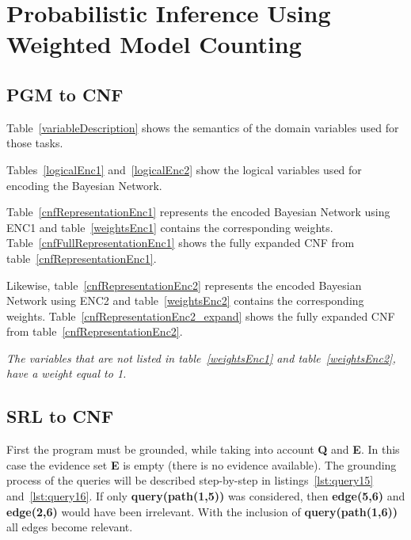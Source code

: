 \section{Probabilistic Inference Using Weighted Model Counting}
\subsection{PGM to CNF}

Table~\ref{variableDescription} shows the semantics of the domain variables used for those tasks.

Tables~\ref{logicalEnc1} and~\ref{logicalEnc2} show the logical variables used for encoding the Bayesian Network.

Table~\ref{cnfRepresentationEnc1} represents the encoded Bayesian Network using ENC1 and table~\ref{weightsEnc1} contains the corresponding weights. Table~\ref{cnfFullRepresentationEnc1} shows the fully expanded CNF from table~\ref{cnfRepresentationEnc1}.

Likewise, table~\ref{cnfRepresentationEnc2} represents the encoded Bayesian Network using ENC2 and table~\ref{weightsEnc2} contains the corresponding weights. Table~\ref{cnfRepresentationEnc2_expand} shows the fully expanded CNF from table~\ref{cnfRepresentationEnc2}.

\textit{The variables that are not listed in table~\ref{weightsEnc1} and table~\ref{weightsEnc2}, have a weight equal to 1. }













\subsection{SRL to CNF}

First the program must be grounded, while taking into account \textbf{Q} and \textbf{E}. In this case the evidence set \textbf{E} is empty (there is no evidence available). The grounding process of the queries will be described step-by-step in listings~\ref{lst:query15} and~\ref{lst:query16}.  If only \textbf{query(path(1,5))} was considered, then \textbf{edge(5,6)} and \textbf{edge(2,6)} would have been irrelevant. With the inclusion of \textbf{query(path(1,6))} all edges become relevant.

